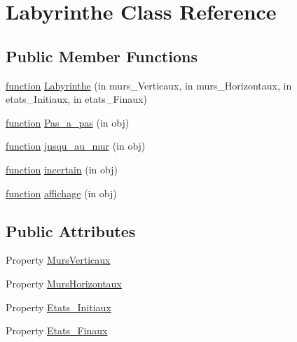 \hypertarget{class_labyrinthe}{}\section{Labyrinthe Class Reference}
\label{class_labyrinthe}
\subsection*{Public Member Functions}
\begin{DoxyCompactItemize}
\item 
\hyperlink{_plan__desuma_functions_8m_ac2ffb26d6f42d3bbcd7847b0873403f4}{function} \hyperlink{class_labyrinthe_a6fffd8c87c9756d8d7b18294daa29ca5}{Labyrinthe} (in murs\+\_\+\+Verticaux, in murs\+\_\+\+Horizontaux, in etats\+\_\+\+Initiaux, in etats\+\_\+\+Finaux)
\item 
\hyperlink{_plan__desuma_functions_8m_ac2ffb26d6f42d3bbcd7847b0873403f4}{function} \hyperlink{class_labyrinthe_a83ffa74a2a322b1866e7366623a7c4e0}{Pas\+\_\+a\+\_\+pas} (in obj)
\item 
\hyperlink{_plan__desuma_functions_8m_ac2ffb26d6f42d3bbcd7847b0873403f4}{function} \hyperlink{class_labyrinthe_a7b95620bd4b1d31b6d76a5d1a0a4c422}{jusqu\+\_\+au\+\_\+mur} (in obj)
\item 
\hyperlink{_plan__desuma_functions_8m_ac2ffb26d6f42d3bbcd7847b0873403f4}{function} \hyperlink{class_labyrinthe_a6ca8be288490170254d0df6579a59ee3}{incertain} (in obj)
\item 
\hyperlink{_plan__desuma_functions_8m_ac2ffb26d6f42d3bbcd7847b0873403f4}{function} \hyperlink{class_labyrinthe_a961e73a265b479f0e68fdf4600ff9cd7}{affichage} (in obj)
\end{DoxyCompactItemize}
\subsection*{Public Attributes}
\begin{DoxyCompactItemize}
\item 
Property \hyperlink{class_labyrinthe_a66ec56695d6cfd3c4594e2c6c51ee614}{Murs\+Verticaux}
\item 
Property \hyperlink{class_labyrinthe_acb60d22dd0a228d05ce71d91ef76a3ac}{Murs\+Horizontaux}
\item 
Property \hyperlink{class_labyrinthe_a064dc23b7761f6f77a664dca0dd3570d}{Etats\+\_\+\+Initiaux}
\item 
Property \hyperlink{class_labyrinthe_a277e48199e98efcc0a61d43ad52de86d}{Etats\+\_\+\+Finaux}
\end{DoxyCompactItemize}


